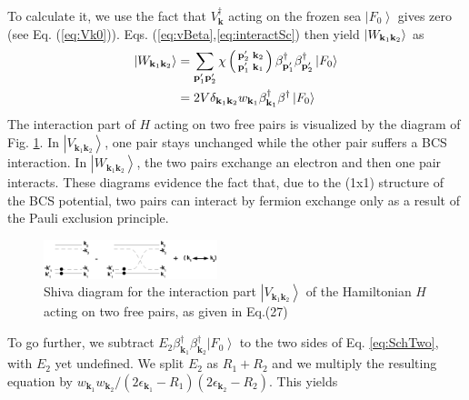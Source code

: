 \documentclass[aps,prb,superscriptaddress,showpacs,reprint,lengthcheck]{revtex4-1}
\newcommand{\vk}{\ensuremath{\mathbf{k}}}
\newcommand{\vp}{\ensuremath{\mathbf{p}}}
\begin{document}
To calculate it, we use the fact that $V^{\dagger}_{\mathbf{k}}$ acting on the frozen sea $\left|F_0\right>$ gives zero (see Eq. (\ref{eq:Vk0})).  Eqs. (\ref{eq:vBeta},\ref{eq:interactSc}) then yield  $\left|W_{%
\mathbf{k} _1\mathbf{k} _2}\right> $ as 
\begin{equation}\label{eq:omega2}
\begin{split}
\left|W_{\mathbf{k} _1\mathbf{k} _2}\right>&=\sum_{\mathbf{p} ^{\prime}_1\mathbf{p}
^{\prime}_2}\chi\left(\begin{smallmatrix}\vp'_2&\vk_2\\\vp'_1&\vk_1%
\end{smallmatrix}\right)  \beta^{\dagger}_{\mathbf{p} ^{\prime}_1}\beta^{%
\dagger}_{\mathbf{p} ^{\prime}_2}\left|F_0\right> \\
&=2V\delta_{\mathbf{k} _1\mathbf{k} _2}w_{\mathbf{k} _1}\beta^{\dagger}_{
\mathbf{k} _1} \beta^{\dagger}\left|F_0\right> 
\end{split}
\end{equation}
The interaction part of $H$ acting on two free pairs is  visualized by
the diagram of Fig. \ref{fig:twoP}. In $\left|V_{\mathbf{k} _1\mathbf{k} _2}\right>$, one pair stays unchanged while the other pair suffers a BCS interaction. In $\left|W_{\mathbf{k} _1\mathbf{k} _2}\right>$, the two pairs exchange an electron and then one pair interacts.   These diagrams evidence the fact that,
due to the (1x1) structure of the BCS potential,  two pairs 
can  interact by fermion exchange only as a result of the
Pauli exclusion principle.

\begin{figure}[htb]
   \includegraphics[width=0.45\textwidth]{twoPair.eps}
\caption{Shiva diagram for the interaction part $\left|V_{\mathbf{k} _1\mathbf{k} _2}\right>$ of the Hamiltonian $H$ acting on two free pairs, as given in Eq.(27)}
\label{fig:twoP}
\end{figure}


To go further, we subtract $E _2\beta^{\dagger}_{\mathbf{k}
_1}\beta^{\dagger}_{\mathbf{k} _2}\left|F_0\right>  $ to the two sides of Eq.%
\eqref{eq:SchTwo}, with $E _2$ yet undefined. We split $E _2$ as $R_1+R_2$ and we multiply
the resulting equation by $w_{\mathbf{k} _1}w_{\mathbf{k} _2}/\left(2%
\epsilon_{\mathbf{k} _1}-R_1\right) \left(2\epsilon_{\mathbf{k}
_2}-R_2\right) $. This yields
\end{document}
